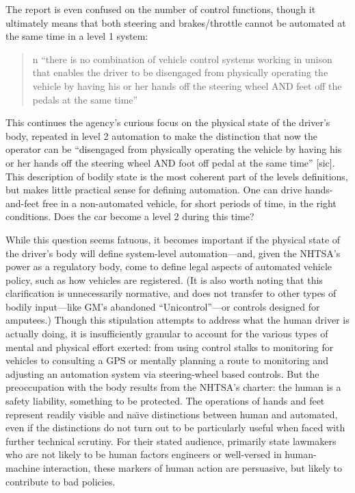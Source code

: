The report is even confused on the number of control functions, though
it ultimately means that both steering and brakes/throttle cannot be
automated at the same time in a level 1 system: 

\begin{quote}n
``there is no combination of vehicle control systems working in unison
that enables the driver to be disengaged from physically operating the
vehicle by having his or her hands off the steering wheel AND feet off
the pedals at the same time''\cite[p. 4]{NHTSA}
\end{quote}

This continues the agency's curious focus on the physical state of the
driver's body, repeated in level 2 automation to make the distinction
that now the operator can be ``disengaged from physically operating the
vehicle by having his or her hands off the steering wheel AND foot off
pedal at the same time'' [sic].\cite[p. 5]{NHTSA} This description of bodily state is
the most coherent part of the levels definitions, but makes little
practical sense for defining automation. One can drive hands-and-feet
free in a non-automated vehicle, for short periods of time, in the
right conditions. Does the car become a level 2 during this time?


While this question seems fatuous, it becomes important if the
physical state of the driver's body will define system-level
automation---and, given the NHTSA's power as a regulatory body, come
to define legal aspects of automated vehicle policy, such as how
vehicles are registered. (It is also worth
noting that this clarification is
unnecessarily normative, and does not transfer to other types of
bodily input---like GM's abandoned ``Unicontrol''\cite[p. 8]{wetmore}---or controls designed
for amputees.) Though this stipulation attempts to address what the
human driver is actually doing, it is insufficiently granular to
account for the various types of mental and physical effort exerted:
from using control stalks to monitoring for vehicles to consulting a
GPS or mentally planning a route to monitoring and adjusting an
automation system via steering-wheel based controls. But the
preoccupation with the body results from the NHTSA's charter: the
human is a safety liability, something to be protected. The operations
of hands and feet represent readily visible and na\"{\i}ve distinctions
between human and automated, even if the distinctions do not turn out
to be particularly useful when faced with further technical scrutiny.
For their stated audience, primarily state lawmakers who are not
likely to be human factors engineers or well-versed in human-machine
interaction, these markers of human action are persuasive, but likely
to contribute to bad policies.

